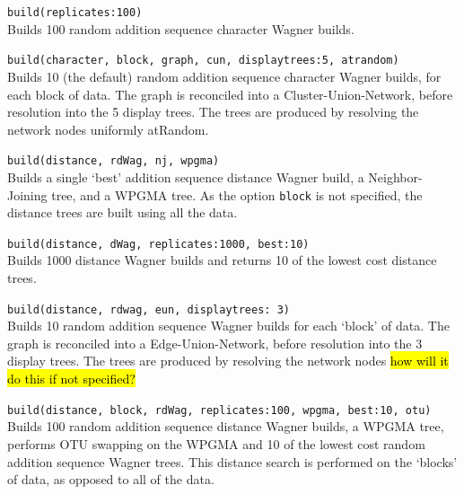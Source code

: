	\begin{example}
	
		\item{\texttt{build(replicates:100)} \\
		Builds 100 random addition sequence character Wagner builds.}
		
		\item{\texttt{build(character, block, graph, cun, displaytrees:5, atrandom)}\\
		Builds 10 (the default) random addition sequence character Wagner builds, for each 
		block of data. The graph is reconciled into a Cluster-Union-Network, before resolution 
		into the 5 display trees. The trees are produced by resolving the network nodes 
		uniformly atRandom.}
		
		\item{\texttt{build(distance, rdWag, nj, wpgma)} \\ 
		Builds a single `best' addition sequence distance Wagner build, a Neighbor-Joining tree, 
		and a WPGMA tree. As the option \texttt{block} is not specified, the distance trees are 
		built using all the data.}
		
		\item{\texttt{build(distance, dWag, replicates:1000, best:10)}\\
		Builds 1000 distance Wagner builds and returns 10 of the lowest cost distance trees.}
	
		\item{\texttt{build(distance, rdwag, eun, displaytrees: 3)}\\
		Builds 10 random addition sequence Wagner builds for each `block' of data. The graph 
		is reconciled into a Edge-Union-Network, before resolution into the 3 display trees. 
		The trees are produced by resolving the network nodes \hl{how will it do this if not specified?}}
		
		\item{\texttt{build(distance, block, rdWag, replicates:100, wpgma, best:10, otu)}\\
		Builds 100 random addition sequence distance Wagner builds, a WPGMA tree, 
		performs OTU swapping on the WPGMA and 10 of the lowest cost random addition 
		sequence Wagner trees. This distance search is performed on the `blocks' of data, 
		as opposed to all of the data.}

	\end{example}

